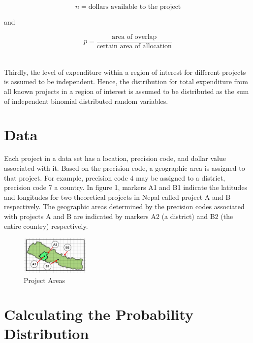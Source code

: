 \documentclass[12pt]{article}
\begin{document}
\begin{equation}
n = \mbox{dollars available to the project}
\end{equation}

and 

\begin{equation}
p = \frac{\mbox{area of overlap}}{\mbox{certain area of allocation}}
\end{equation}
\\ \\
Thirdly, the level of expenditure within a region of interest for different projects is assumed to be independent. Hence, the distribution for total expenditure from all known projects in a region of interest is assumed to be distributed as the sum of independent binomial distributed random variables.

\break

\section{Data} \label{sec:data}

Each project in a data set has a location, precision code, and dollar value associated with it. Based on the precision code, a geographic area is assigned to that project. For example, precision code 4 may be assigned to a district, precision code 7 a country. In figure 1, markers A1 and B1 indicate the latitudes and longitudes for two theoretical projects in Nepal called project A and B respectively. The geographic areas determined by the precision codes associated with projects A and B are indicated by markers A2 (a district) and B2 (the entire country) respectively.

\begin{figure}[!hbt]
\centering
\includegraphics[width=0.3\textwidth]{reliability_map.JPG}
\caption{\label{fig:reliability_map}Project Areas}
\end{figure}

\break

\section{Calculating the Probability Distribution} \label{sec:distribution}
\end{document}
